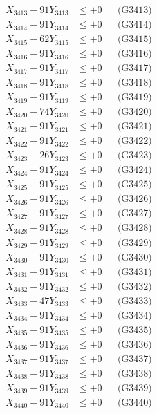 \documentclass[a4paper,10pt]{article}
\begin{document}
{\begin{align}
X_{3413} - 91Y_{3413} &\leq +0 && \text{(G3413)} \\
X_{3414} - 91Y_{3414} &\leq +0 && \text{(G3414)} \\
X_{3415} - 62Y_{3415} &\leq +0 && \text{(G3415)} \\
X_{3416} - 91Y_{3416} &\leq +0 && \text{(G3416)} \\
X_{3417} - 91Y_{3417} &\leq +0 && \text{(G3417)} \\
X_{3418} - 91Y_{3418} &\leq +0 && \text{(G3418)} \\
X_{3419} - 91Y_{3419} &\leq +0 && \text{(G3419)} \\
X_{3420} - 74Y_{3420} &\leq +0 && \text{(G3420)} \\
\allowbreak
X_{3421} - 91Y_{3421} &\leq +0 && \text{(G3421)} \\
X_{3422} - 91Y_{3422} &\leq +0 && \text{(G3422)} \\
X_{3423} - 26Y_{3423} &\leq +0 && \text{(G3423)} \\
X_{3424} - 91Y_{3424} &\leq +0 && \text{(G3424)} \\
X_{3425} - 91Y_{3425} &\leq +0 && \text{(G3425)} \\
X_{3426} - 91Y_{3426} &\leq +0 && \text{(G3426)} \\
X_{3427} - 91Y_{3427} &\leq +0 && \text{(G3427)} \\
X_{3428} - 91Y_{3428} &\leq +0 && \text{(G3428)} \\
X_{3429} - 91Y_{3429} &\leq +0 && \text{(G3429)} \\
X_{3430} - 91Y_{3430} &\leq +0 && \text{(G3430)} \\
\allowbreak
X_{3431} - 91Y_{3431} &\leq +0 && \text{(G3431)} \\
X_{3432} - 91Y_{3432} &\leq +0 && \text{(G3432)} \\
X_{3433} - 47Y_{3433} &\leq +0 && \text{(G3433)} \\
X_{3434} - 91Y_{3434} &\leq +0 && \text{(G3434)} \\
X_{3435} - 91Y_{3435} &\leq +0 && \text{(G3435)} \\
X_{3436} - 91Y_{3436} &\leq +0 && \text{(G3436)} \\
X_{3437} - 91Y_{3437} &\leq +0 && \text{(G3437)} \\
X_{3438} - 91Y_{3438} &\leq +0 && \text{(G3438)} \\
X_{3439} - 91Y_{3439} &\leq +0 && \text{(G3439)} \\
X_{3440} - 91Y_{3440} &\leq +0 && \text{(G3440)} \\

\end{align}}
\end{document}
